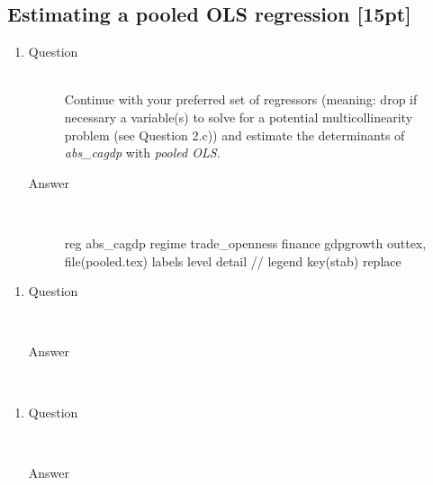 \documentclass{article}
\begin{document}
\subsection{Estimating a pooled OLS regression [15pt]}
  
  \begin{enumerate}[label=(\alph*)]
    \item 
    \begin{description}
      \item[Question] \hfill \\
      Continue with your preferred set of regressors (meaning: drop if necessary a variable(s) to solve for a potential multicollinearity problem (see Question 2.c)) and estimate the determinants of \textit{abs\_cagdp} with \textit{pooled OLS}.
      \item[Answer] \hfill \\
      \begin{CVerbatim}
reg abs_cagdp regime trade_openness finance gdpgrowth
outtex, file(pooled.tex) labels level detail //
  legend key(stab) replace
      \end{CVerbatim}
      
    \end{description}
  \end{enumerate}
  
  \begin{enumerate}[label=(\alph*)]
    \item 
    \begin{description}
      \item[Question] \hfill \\

      \item[Answer] \hfill \\
      
    \end{description}
  \end{enumerate}
  
  \begin{enumerate}[label=(\alph*)]
    \item 
    \begin{description}
      \item[Question] \hfill \\

      \item[Answer] \hfill \\
      
    \end{description}
  \end{enumerate}
  
\end{document}
